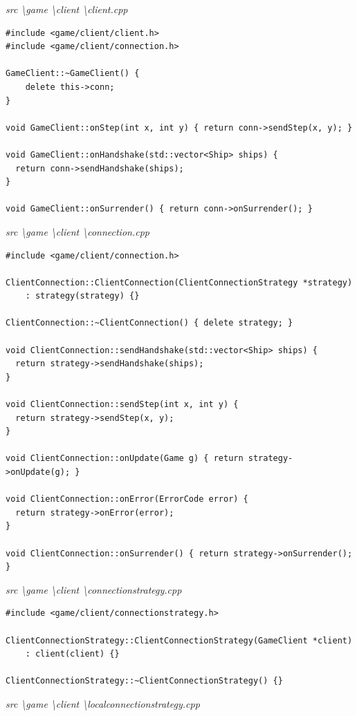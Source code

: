 \documentclass[a4paper,14pt]{extarticle}
\begin{document}
\textit{src \textbackslash game \textbackslash client \textbackslash client.cpp}
\begin{verbatim}
#include <game/client/client.h>
#include <game/client/connection.h>

GameClient::~GameClient() {
    delete this->conn;
}

void GameClient::onStep(int x, int y) { return conn->sendStep(x, y); }

void GameClient::onHandshake(std::vector<Ship> ships) {
  return conn->sendHandshake(ships);
}

void GameClient::onSurrender() { return conn->onSurrender(); }

\end{verbatim}
\textit{src \textbackslash game \textbackslash client \textbackslash connection.cpp}
\begin{verbatim}
#include <game/client/connection.h>

ClientConnection::ClientConnection(ClientConnectionStrategy *strategy)
    : strategy(strategy) {}

ClientConnection::~ClientConnection() { delete strategy; }

void ClientConnection::sendHandshake(std::vector<Ship> ships) {
  return strategy->sendHandshake(ships);
}

void ClientConnection::sendStep(int x, int y) {
  return strategy->sendStep(x, y);
}

void ClientConnection::onUpdate(Game g) { return strategy->onUpdate(g); }

void ClientConnection::onError(ErrorCode error) {
  return strategy->onError(error);
}

void ClientConnection::onSurrender() { return strategy->onSurrender(); }

\end{verbatim}
\textit{src \textbackslash game \textbackslash client \textbackslash connectionstrategy.cpp}
\begin{verbatim}
#include <game/client/connectionstrategy.h>

ClientConnectionStrategy::ClientConnectionStrategy(GameClient *client)
    : client(client) {}

ClientConnectionStrategy::~ClientConnectionStrategy() {}

\end{verbatim}
\textit{src \textbackslash game \textbackslash client \textbackslash localconnectionstrategy.cpp}
\end{document}

